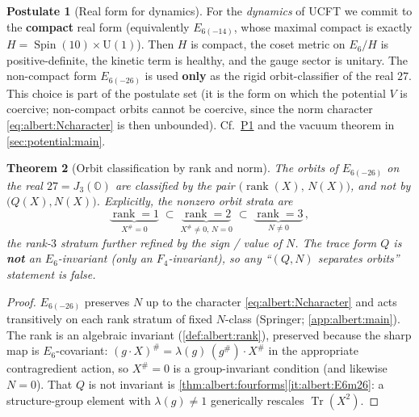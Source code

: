\documentclass[11pt]{article}
\theoremstyle{plain}
\newtheorem{theorem}{Theorem}[section]
\theoremstyle{definition}
\newtheorem{postulate}[theorem]{Postulate}
\theoremstyle{remark}
\begin{document}
\begin{postulate}[Real form for dynamics]\label{post:albert:realform}
For the \emph{dynamics} of UCFT we commit to the \textbf{compact} real
form (equivalently $E_{6(-14)}$, whose maximal compact is exactly
$H=\operatorname{Spin}(10)\times\mathrm{U}(1)$). Then $H$ is compact, the
coset metric on $E_{6}/H$ is positive-definite, the kinetic term is
healthy, and the gauge sector is unitary. The non-compact form
$E_{6(-26)}$ is used \textbf{only} as the rigid orbit-classifier of the
real $27$. This choice is part of the postulate set (it is the form on
which the potential $V$ is coercive; non-compact orbits cannot be
coercive, since the norm character \eqref{eq:albert:Ncharacter} is then
unbounded). Cf.\ \hyperref[post:potential:P1]{P1} and the vacuum theorem
in \autoref{sec:potential:main}.
\end{postulate}

\begin{theorem}[Orbit classification by rank and norm]\label{thm:albert:orbits}
\label{thm:OrbitClass}
The orbits of $E_{6(-26)}$ on the real $27=J_{3}(\mathbb{O})$ are
classified by the pair $\bigl(\operatorname{rank}(X),\,N(X)\bigr)$, and
\emph{not} by $\bigl(Q(X),N(X)\bigr)$. Explicitly, the nonzero orbit
strata are
\begin{equation}\label{eq:albert:orbitstrata}
  \underbrace{\operatorname{rank}=1}_{X^{\#}=0}\;\subset\;
  \underbrace{\operatorname{rank}=2}_{X^{\#}\neq 0,\,N=0}\;\subset\;
  \underbrace{\operatorname{rank}=3}_{N\neq 0}\,,
\end{equation}
the rank-$3$ stratum further refined by the sign / value of $N$. The
trace form $Q$ is \textbf{not} an $E_{6}$-invariant (only an
$F_{4}$-invariant), so any ``$(Q,N)$ separates orbits'' statement is
false.
\end{theorem}

\begin{proof}
$E_{6(-26)}$ preserves $N$ up to the character
\eqref{eq:albert:Ncharacter} and acts transitively on each rank stratum
of fixed $N$-class (Springer; \autoref{app:albert:main}). The rank is an
algebraic invariant (\autoref{def:albert:rank}), preserved because the
sharp map is $E_{6}$-covariant: $(g\cdot X)^{\#}=\lambda(g)\,
(g^{\#})\!\cdot X^{\#}$ in the appropriate contragredient action, so
$X^{\#}=0$ is a group-invariant condition (and likewise $N=0$). That $Q$
is not invariant is \autoref{thm:albert:fourforms}\ref{it:albert:E6m26}:
a structure-group element with $\lambda(g)\neq1$ generically rescales
$\operatorname{Tr}(X^{2})$.
\end{proof}
\end{document}
